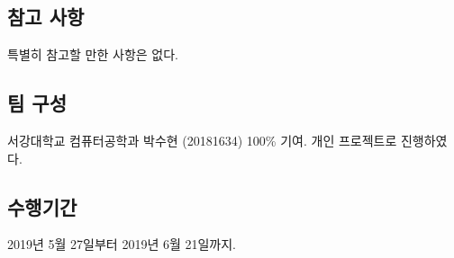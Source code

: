 \subsection{참고 사항}
특별히 참고할 만한 사항은 없다.

\subsection{팀 구성}
서강대학교 컴퓨터공학과 박수현 (20181634) 100\% 기여. 개인 프로젝트로 진행하였다.

\subsection{수행기간}
2019년 5월 27일부터 2019년 6월 21일까지.


